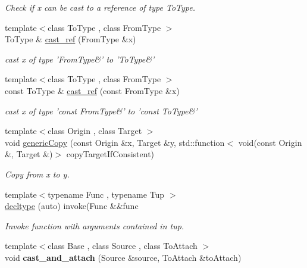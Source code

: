 \begin{DoxyCompactItemize}
\begin{DoxyCompactList}\small\item\em \-Check if x can be cast to a reference of type \-To\-Type. \end{DoxyCompactList}\item 
\hypertarget{namespaceSpacy_abb0550fc1d402f00e42c165ae8eb3305}{{\footnotesize template$<$class To\-Type , class From\-Type $>$ }\\\-To\-Type \& \hyperlink{namespaceSpacy_abb0550fc1d402f00e42c165ae8eb3305}{cast\-\_\-ref} (\-From\-Type \&x)}\label{namespaceSpacy_abb0550fc1d402f00e42c165ae8eb3305}

\begin{DoxyCompactList}\small\item\em cast x of type '\-From\-Type\&' to '\-To\-Type\&' \end{DoxyCompactList}\item 
\hypertarget{namespaceSpacy_a00fc9d674cd8813c4e20a05adf3aaaa4}{{\footnotesize template$<$class To\-Type , class From\-Type $>$ }\\const \-To\-Type \& \hyperlink{namespaceSpacy_a00fc9d674cd8813c4e20a05adf3aaaa4}{cast\-\_\-ref} (const \-From\-Type \&x)}\label{namespaceSpacy_a00fc9d674cd8813c4e20a05adf3aaaa4}

\begin{DoxyCompactList}\small\item\em cast x of type 'const \-From\-Type\&' to 'const \-To\-Type\&' \end{DoxyCompactList}\item 
{\footnotesize template$<$class Origin , class Target $>$ }\\void \hyperlink{namespaceSpacy_a7dd8ce352c45e326cf8966befd5159ce}{generic\-Copy} (const \-Origin \&x, \-Target \&y, std\-::function$<$ void(const \-Origin \&, \-Target \&)$>$ copy\-Target\-If\-Consistent)
\begin{DoxyCompactList}\small\item\em \-Copy from x to y. \end{DoxyCompactList}\item 
{\footnotesize template$<$typename Func , typename Tup $>$ }\\\hyperlink{namespaceSpacy_afbcee52cc294417930c5ccfc2fefb9f8}{decltype} (auto) invoke(\-Func \&\&func
\begin{DoxyCompactList}\small\item\em \-Invoke function with arguments contained in tup. \end{DoxyCompactList}\item 
\hypertarget{namespaceSpacy_a84ea9f9186cc834141aa9fa996521007}{{\footnotesize template$<$class Base , class Source , class To\-Attach $>$ }\\void {\bfseries cast\-\_\-and\-\_\-attach} (\-Source \&source, \-To\-Attach \&to\-Attach)}\label{namespaceSpacy_a84ea9f9186cc834141aa9fa996521007}


\end{DoxyCompactItemize}
